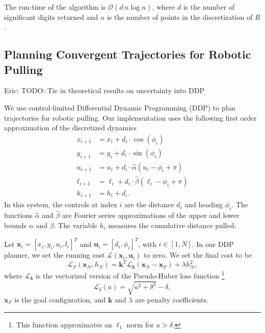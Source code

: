 \documentclass[conference]{IEEEtran}
\newcommand{\EH}[1]{{\color{blue} {Eric: {#1}}  }}
\begin{document}
The run-time of the algorithm is $\mathcal{O}(d\,n\log{} n)$, where
$d$ is the number of significant digits returned and $n$ is the number
of points in the discretization of $R$.

\subsection{Planning Convergent Trajectories for Robotic
  Pulling}\label{sec:diff-dynam-progr}
\EH{TODO: Tie in theoretical results on uncertainty into DDP} 

We use control-limited Differential Dynamic Programming (DDP)
\cite{tassa2014control} to plan trajectories for robotic pulling.  Our
implementation uses the following first order approximation of the
discretized dynamics
\begin{align}
  x_{i+1} &= x_i + d_i\cdot\cos(\phi_i) \\
  y_{i+1} &= y_i + d_i\cdot\sin(\phi_i)\\
  u_{i+1} &= u_i + d_i\cdot\hat{\alpha}(u_i - \phi_i + \pi) \\
  \ell_{i+1} &= \ell_i + d_i\cdot\hat{\beta}(\ell_i - \phi_i + \pi)\\
  h_{i+1} &= h_i + d_i.
\end{align}
In this system, the controls at index $i$ are the distance $d_i$ and
heading $\phi_i$. The functions $\hat{\alpha}$ and $\hat{\beta}$ are
Fourier series approximations of the upper and lower bounds $\alpha$
and $\beta$. The variable $h_i$ measures the cumulative distance
pulled.

Let $\mathbf{x}_i = [x_i,y_i,u_i,l_i]^T$ and
$\mathbf{u}_i = [d_i,\phi_i]^T$, with $i\in[1,N]$. In our DDP planner,
we set the running cost $\mathcal{L}(\mathbf{x}_i,\mathbf{u}_i)$ to
zero. We set the final cost to be
\begin{equation}
\mathcal{L}_F(\mathbf{x}_N,h_N) = \mathbf{k}^T\mathcal{L}_{\bm{\delta}}(\mathbf{x}_N-\mathbf{x}_F) + \lambda h_N^2,
\end{equation}
where $\mathcal{L}_{\bm{\delta}}$ is the vectorized version of the
Pseudo-Huber loss function \footnote{This function approximates an
  $\ell_1$ norm for $a > \delta$.}
\begin{equation}
\mathcal{L}_{\delta}(a) = \sqrt{a^2+\delta^2}-\delta,
\end{equation}
$\mathbf{x}_F$ is the goal configuration, and $\mathbf{k}$ and
$\lambda$ are penalty coefficients.
\end{document}
